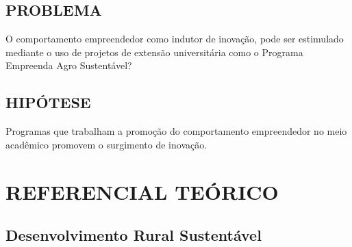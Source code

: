 \section{PROBLEMA}

O comportamento empreendedor como indutor de inovação, pode ser estimulado mediante o uso de projetos de extensão universitária como o Programa Empreenda Agro Sustentável? 


\section{HIPÓTESE}

Programas que trabalham a promoção do comportamento empreendedor no meio acadêmico promovem o surgimento de inovação.








\chapter{REFERENCIAL TEÓRICO}

\section{Desenvolvimento Rural Sustentável}

